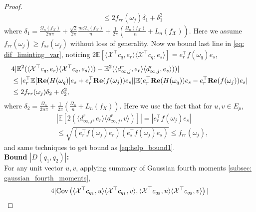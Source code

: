 \begin{proof}
\begin{equation}
\begin{aligned}
&\le 2f_{rr}(\omega_j) \delta_1+\delta_1^2
\end{aligned}
\end{equation}
where $\delta_1 =  \frac{\Omega_n(f_\mathcal{X})}{2n\pi}+\frac{\sqrt{2}}{2\pi}\frac{m\Omega_n(f_\mathcal{X})}{n}+ \frac{1}{2\pi}\left(\frac{\Omega_n(f_\mathcal{X})}{n} + L_n(f_\mathcal{X})\right)$. Here we assume $f_{rr}(\omega_j)\geq f_{ss}(\omega_j)$ without loss of generality. 
Now we bound last line in \eqref{eq: dif_liminting_var}, noticing $2\mathbb{E}[\langle \mathcal{X}^\top  c_{q}, e_r\rangle\langle \mathcal{X}^\top  c_{q}, e_s\rangle] = e_r^\top  f(\omega_q)e_s$, 
\begin{equation}
\begin{aligned}
&4|\mathbb{E}^2(\langle \mathcal{X}^\top  c_q,e_r\rangle \langle \mathcal{X}^\top  c_q,e_s\rangle) )-\mathbb{E}^2(\langle d^{r}_{\infty, j},e_r\rangle \langle d^{r}_{\infty, j},e_s\rangle) )|\\
&\le | e_r^\top  \mathbb{E}[{\bf Re}(H(\omega_q)]e_s+e_r^\top  {\bf Re}(f(\omega_j))e_s||\mathbb{E} (e_r^\top  {\bf Re}(H(\omega_q))e_s-e_r^\top  {\bf Re}(f(\omega_j))e_s|\\
&\le 2f_{rr}(\omega_j)\delta_2+\delta_2^2,
\end{aligned}
\end{equation}
where $\delta_2= \frac{\Omega_n}{2n\pi}+ \frac{1}{2\pi}\left(\frac{\Omega_n}{n} + L_n(f_X)\right)$. Here we use the fact that for $u, v\in E_p$, 
\begin{equation}
\begin{aligned}
&|\mathbb{E} [2(\langle d^{r}_{\infty, j},e_r\rangle \langle d^{r}_{\infty, j},v\rangle)]|  = |e_r^\top  f(\omega_j)e_s|\\
&\le \sqrt{(e_r^\top  f(\omega_j)e_r)(e_s^\top  f(\omega_j)e_s)}\le f_{rr}(\omega_j), 
\end{aligned}
\end{equation}
and same techniques to get bound as \eqref{eq:help_bound1}. \\[0.2cm]
{\bf Bound $|D(q_1,q_2)|$:}\\
For any unit vector $u,v$, applying summary of Gaussian fourth moments \ref{subsec: gaussian_fourth_moments}, 
\begin{equation}
\begin{aligned}
&4|\cov\left(\langle \mathcal{X}^\top  c_{q_1}, u \rangle  \langle \mathcal{X}^\top  c_{q_1}, v \rangle ,  \langle \mathcal{X}^\top  c_{q_2}, u \rangle  \langle \mathcal{X}^\top  c_{q_2}, v \rangle\right)| \\

\end{aligned}
\end{equation}
\end{proof}
